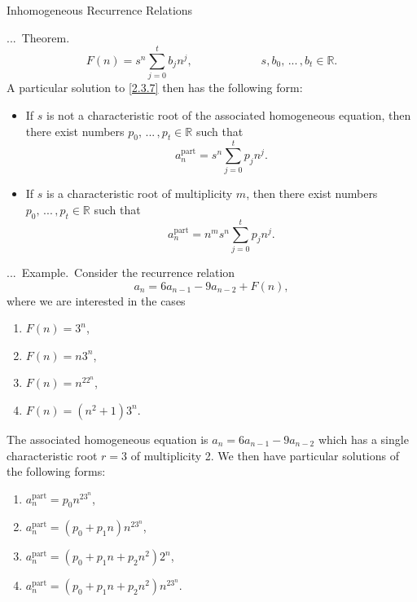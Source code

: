 \documentclass[smaller,hyperref={CJKbookmarks=true}]{beamer}
\newcommand{\R}{\mathbb{R}}
\newcounter{zhuo}[subsection]
\renewcommand{\thezhuo}{\thesection.\thesubsection.\arabic{zhuo}}
\newenvironment{EXAMPLE}{\stepcounter{zhuo}\alert{\!\thezhuo.~Example.\,}}{}
\newenvironment{THEOREM}{\stepcounter{zhuo}\alert{\thezhuo.~Theorem.\,}}{}
\begin{document}
\begin{frame}{Inhomogeneous Recurrence Relations}
\begin{spacing}{0.6}
\begin{THEOREM}
\[F(n)=s^n\sum_{j=0}^{t}b_jn^j,\qquad\qquad\qquad
s,b_0,\,...\,,b_t\in\R.\]
A particular solution to \eqref{2.3.7} then has the following form:
\begin{itemize}
  \item If $s$ is not a characteristic root of the associated homogeneous equation, then there exist numbers $p_0,\,...\,,p_t\in\R$ such that
      \[a_n^{\text{part}}=s^n\sum_{j=0}^{t}p_jn^j.\]
  \item If $s$ is a characteristic root of multiplicity $m$, then there exist numbers $p_0,\,...\,,p_t\in\R$ such that
      \[a_n^{\text{part}}=n^ms^n\sum_{j=0}^{t}p_jn^j.\]
\end{itemize}
\end{THEOREM}
\newpage
\begin{EXAMPLE}
Consider the recurrence relation
\[a_n=6a_{n-1}-9a_{n-2}+F(n),\]
where we are interested in the cases
\begin{enumerate}[1.]
  \item $F(n)=3^n$,
  \item $F(n)=n3^n$,
  \item $F(n)=n^22^n$,
  \item $F(n)=(n^2+1)3^n$.
\end{enumerate}
The associated homogeneous equation is $a_n=6a_{n-1}-9a_{n-2}$ which has a single characteristic root $r=3$ of multiplicity 2. We then have particular solutions of the following forms:
\begin{enumerate}[1.]
  \item $a_n^{\text{part}}=p_0n^23^n$,
  \item $a_n^{\text{part}}=(p_0+p_1n)n^23^n$,
  \item $a_n^{\text{part}}=(p_0+p_1n+p_2n^2)2^n$,
  \item $a_n^{\text{part}}=(p_0+p_1n+p_2n^2)n^23^n$.
\end{enumerate}
\end{EXAMPLE}
\end{spacing}
\end{frame}
\end{document}
